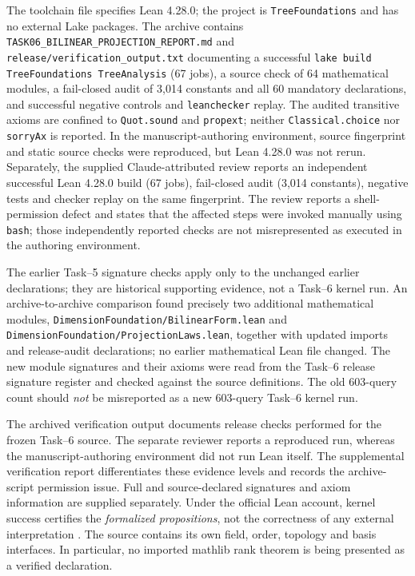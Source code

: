 \documentclass[11pt,reqno]{amsart}
\theoremstyle{definition}\newtheorem{definition}[theorem]{Definition}
\theoremstyle{remark}\newtheorem{remark}[theorem]{Remark}
\begin{document}
The toolchain file specifies Lean 4.28.0; the project is \texttt{TreeFoundations} and has no external Lake packages. The archive contains \texttt{TASK06\_BILINEAR\_PROJECTION\_REPORT.md} and \texttt{release/verification\_output.txt} documenting a successful \texttt{lake build TreeFoundations TreeAnalysis} (67 jobs), a source check of 64 mathematical modules, a fail-closed audit of 3,014 constants and all 60 mandatory declarations, and successful negative controls and \texttt{leanchecker} replay. The audited transitive axioms are confined to \texttt{Quot.sound} and \texttt{propext}; neither \texttt{Classical.choice} nor \texttt{sorryAx} is reported. In the manuscript-authoring environment, source fingerprint and static source checks were reproduced, but Lean 4.28.0 was not rerun. Separately, the supplied Claude-attributed review reports an independent successful Lean 4.28.0 build (67 jobs), fail-closed audit (3,014 constants), negative tests and checker replay on the same fingerprint. The review reports a shell-permission defect and states that the affected steps were invoked manually using \texttt{bash}; those independently reported checks are not misrepresented as executed in the authoring environment.

The earlier Task--5 signature checks apply only to the unchanged earlier declarations; they are historical supporting evidence, not a Task--6 kernel run. An archive-to-archive comparison found precisely two additional mathematical modules, \texttt{DimensionFoundation/BilinearForm.lean} and \texttt{DimensionFoundation/ProjectionLaws.lean}, together with updated imports and release-audit declarations; no earlier mathematical Lean file changed. The new module signatures and their axioms were read from the Task--6 release signature register and checked against the source definitions. The old 603-query count should \emph{not} be misreported as a new 603-query Task--6 kernel run.

The archived verification output documents release checks performed for the frozen Task--6 source. The separate reviewer reports a reproduced run, whereas the manuscript-authoring environment did not run Lean itself. The supplemental verification report differentiates these evidence levels and records the archive-script permission issue. Full and source-declared signatures and axiom information are supplied separately. Under the official Lean account, kernel success certifies the \emph{formalized propositions}, not the correctness of any external interpretation \cite{leanmanual}. The source contains its own field, order, topology and basis interfaces. In particular, no imported mathlib rank theorem is being presented as a verified declaration.
\end{document}
